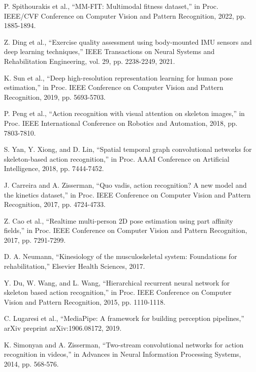 \documentclass[11pt]{article}
\begin{document}
\begin{thebibliography}{16}
 P. Spithourakis et al., ``MM-FIT: Multimodal fitness dataset,'' in Proc. IEEE/CVF Conference on Computer Vision and Pattern Recognition, 2022, pp. 1885-1894.

 Z. Ding et al., ``Exercise quality assessment using body-mounted IMU sensors and deep learning techniques,'' IEEE Transactions on Neural Systems and Rehabilitation Engineering, vol. 29, pp. 2238-2249, 2021.

 K. Sun et al., ``Deep high-resolution representation learning for human pose estimation,'' in Proc. IEEE Conference on Computer Vision and Pattern Recognition, 2019, pp. 5693-5703.

 P. Peng et al., ``Action recognition with visual attention on skeleton images,'' in Proc. IEEE International Conference on Robotics and Automation, 2018, pp. 7803-7810.

 S. Yan, Y. Xiong, and D. Lin, ``Spatial temporal graph convolutional networks for skeleton-based action recognition,'' in Proc. AAAI Conference on Artificial Intelligence, 2018, pp. 7444-7452.

 J. Carreira and A. Zisserman, ``Quo vadis, action recognition? A new model and the kinetics dataset,'' in Proc. IEEE Conference on Computer Vision and Pattern Recognition, 2017, pp. 4724-4733.

 Z. Cao et al., ``Realtime multi-person 2D pose estimation using part affinity fields,'' in Proc. IEEE Conference on Computer Vision and Pattern Recognition, 2017, pp. 7291-7299.

 D. A. Neumann, ``Kinesiology of the musculoskeletal system: Foundations for rehabilitation,'' Elsevier Health Sciences, 2017.

 Y. Du, W. Wang, and L. Wang, ``Hierarchical recurrent neural network for skeleton based action recognition,'' in Proc. IEEE Conference on Computer Vision and Pattern Recognition, 2015, pp. 1110-1118.

 C. Lugaresi et al., ``MediaPipe: A framework for building perception pipelines,'' arXiv preprint arXiv:1906.08172, 2019.

 K. Simonyan and A. Zisserman, ``Two-stream convolutional networks for action recognition in videos,'' in Advances in Neural Information Processing Systems, 2014, pp. 568-576.


\end{thebibliography}
\end{document}
